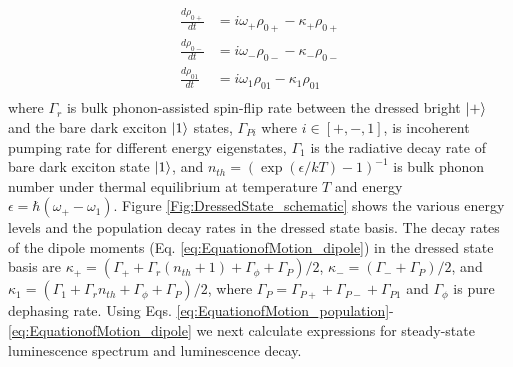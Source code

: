 \documentclass[aps,pra,preprint,groupedaddress]{revtex4-1}
\begin{document}
\begin{equation} 
\label{eq:EquationofMotion_dipole}
\begin{aligned}
\frac{d\rho_{0+}}{dt} &= i\omega_{+}\rho_{0+}-\kappa_{+}\rho_{0+}\\
\frac{d\rho_{0-}}{dt} &= i\omega_{-}\rho_{0-}-\kappa_{-}\rho_{0-}\\
\frac{d\rho_{01}}{dt} &= i\omega_{1}\rho_{01}-\kappa_{1}\rho_{01}\\
\end{aligned}
\end{equation}
where $\Gamma_r$ is bulk phonon-assisted spin-flip rate between the dressed bright $\ket{+}$ and the bare dark exciton $\ket{1}$ states, $\Gamma_{Pi}$ where $i\in[+,-,1]$, is incoherent pumping rate for different energy eigenstates, $\Gamma_1$ is the radiative decay rate of bare dark exciton state $\ket{1}$, and $n_{th} = (\exp{(\epsilon/kT) - 1})^{-1}$ is bulk phonon number under thermal equilibrium at temperature $T$ and energy $\epsilon = \hbar(\omega_+ - \omega_{1})$. Figure \ref{Fig:DressedState_schematic} shows the various energy levels and the population decay rates in the dressed state basis. The decay rates of the dipole moments (Eq. \ref{eq:EquationofMotion_dipole}) in the dressed state basis are $\kappa_{+} = (\Gamma_{+}+\Gamma_r(n_{th}+1)+\Gamma_\phi+\Gamma_P)/2$, $\kappa_{-} = (\Gamma_{-}+\Gamma_P)/2$, and $\kappa_{1} = (\Gamma_{1}+\Gamma_rn_{th}+\Gamma_\phi+\Gamma_P)/2$, where $\Gamma_P = \Gamma_{P+}+\Gamma_{P-}+\Gamma_{P1}$ and $\Gamma_\phi$ is pure dephasing rate. Using Eqs. \ref{eq:EquationofMotion_population}-\ref{eq:EquationofMotion_dipole} we next calculate expressions for steady-state luminescence spectrum and luminescence decay.

\end{document}
